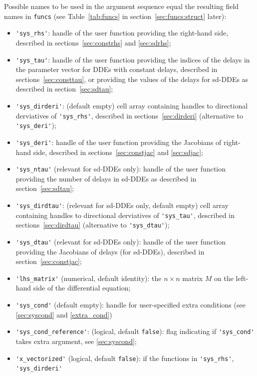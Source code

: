 \documentclass[10pt]{scrartcl}
\newcommand{\blist}[1]{\mbox{\lstinline!#1!}}
\begin{document}
Possible names to be used in the argument sequence
equal the resulting field names in \blist{funcs} (see
Table~\ref{tab:funcs} in section~\ref{sec:funcs:struct} later):
\begin{itemize}
\item \blist{'sys_rhs'}: handle of the user function providing the
  right-hand side, described in sections~\ref{sec:constrhs} and
  \ref{sec:sdrhs};
\item \blist{'sys_tau'}: handle of the user function providing the
  indices of the delays in the parameter vector for DDEs with constant
  delays, described in sections~\ref{sec:consttau}, or providing the
  values of the delays for sd-DDEs as described in
  section~\ref{sec:sdtau};
\item \blist{'sys_dirderi'}: (default empty) cell array containing
  handles to directional derviatives of \blist{'sys_rhs'}, described
  in sections~\ref{sec:dirderi} (alternative to \blist{'sys_deri'});
\item \blist{'sys_deri'}: handle of the user function providing the
  Jacobians of right-hand side, described in
  sections~\ref{sec:constjac} and \ref{sec:sdjac};
\item \blist{'sys_ntau'} (relevant for sd-DDEs only): handle of the
  user function providing the number of delays in sd-DDEs as described
  in section~\ref{sec:sdtau};
\item \blist{'sys_dirdtau'}: (relevant for sd-DDEs only, default empty)
  cell array containing handles to directional derviatives of
  \blist{'sys_tau'}, described in sections~\ref{sec:dirdtau}
  (alternative to \blist{'sys_dtau'});
\item \blist{'sys_dtau'} (relevant for sd-DDEs only): handle of the user
  function providing the Jacobians of delays (for sd-DDEs), described
  in section~\ref{sec:constjac};
\item \blist{'lhs_matrix'} (numerical, default identity): the
  $n\times n$ matrix $M$ on the left-hand side of the differential equation;
\item \blist{'sys_cond'} (default empty): handle for user-specified extra conditions
  (see \cref{sec:syscond} and \cref{extra_cond})
\item \blist{'sys_cond_reference'}: (logical, default \blist{false}):
  flag indicating if \blist{'sys_cond'} takes extra argument, see \cref{sec:syscond};
\item \blist{'x_vectorized'} (logical, default \blist{false}): if the
  functions in \blist{'sys_rhs'}, \blist{'sys_dirderi'}

\end{itemize}
\end{document}

